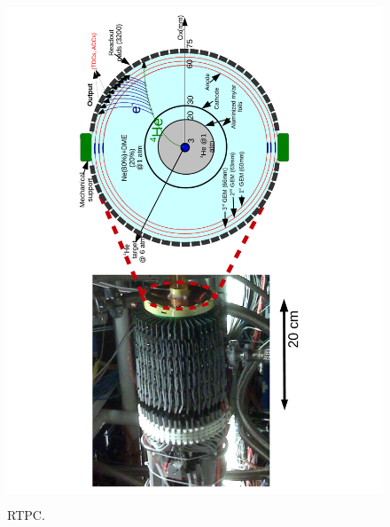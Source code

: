 \documentclass[12pt]{article}
\begin{document}
\maketitle

\section*{}


\begin{figure}[tpb]
   \centering
  \includegraphics[height=15.0cm, angle =-90]{RTPC.pdf}
  \caption{RTPC.}
  \label{fig:}
 \end{figure}                                                                  
\end{document}
